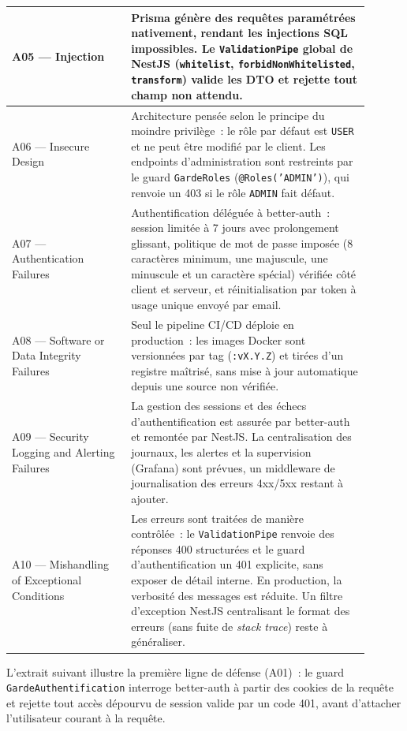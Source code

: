 \begin{longtable}{|>{\raggedright\arraybackslash}p{0.30\linewidth}|>{\raggedright\arraybackslash}p{0.60\linewidth}|}
    \hline
    A05 --- Injection & Prisma génère des requêtes paramétrées nativement, rendant les injections SQL impossibles. Le \texttt{ValidationPipe} global de NestJS (\texttt{whitelist}, \texttt{forbidNonWhitelisted}, \texttt{transform}) valide les DTO et rejette tout champ non attendu. \\
    \hline
    A06 --- Insecure Design & Architecture pensée selon le principe du moindre privilège~: le rôle par défaut est \texttt{USER} et ne peut être modifié par le client. Les endpoints d'administration sont restreints par le guard \texttt{GardeRoles} (\texttt{@Roles('ADMIN')}), qui renvoie un 403 si le rôle \texttt{ADMIN} fait défaut. \\
    \hline
    A07 --- Authentication Failures & Authentification déléguée à better-auth~: session limitée à 7 jours avec prolongement glissant, politique de mot de passe imposée (8 caractères minimum, une majuscule, une minuscule et un caractère spécial) vérifiée côté client et serveur, et réinitialisation par token à usage unique envoyé par email. \\
    \hline
    A08 --- Software or Data Integrity Failures & Seul le pipeline CI/CD déploie en production~: les images Docker sont versionnées par tag (\texttt{:vX.Y.Z}) et tirées d'un registre maîtrisé, sans mise à jour automatique depuis une source non vérifiée. \\
    \hline
    A09 --- Security Logging and Alerting Failures & La gestion des sessions et des échecs d'authentification est assurée par better-auth et remontée par NestJS. La centralisation des journaux, les alertes et la supervision (Grafana) sont prévues, un middleware de journalisation des erreurs 4xx/5xx restant à ajouter. \\
    \hline
    A10 --- Mishandling of Exceptional Conditions & Les erreurs sont traitées de manière contrôlée~: le \texttt{ValidationPipe} renvoie des réponses 400 structurées et le guard d'authentification un 401 explicite, sans exposer de détail interne. En production, la verbosité des messages est réduite. Un filtre d'exception NestJS centralisant le format des erreurs (sans fuite de \emph{stack trace}) reste à généraliser. \\
    \hline
\end{longtable}

L'extrait suivant illustre la première ligne de défense (A01)~: le guard \texttt{GardeAuthentification} interroge better-auth à partir des cookies de la requête et rejette tout accès dépourvu de session valide par un code 401, avant d'attacher l'utilisateur courant à la requête.

